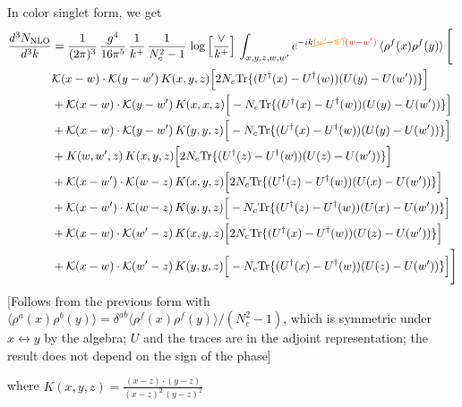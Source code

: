 \documentclass[9pt]{article}
\numberwithin{equation}{section}
\begin{document}
In color singlet form, we get
\begin{align}
\frac{d^{3}N_{\mathrm{NLO}}}{d^{3}k} & = \frac{1}{(2\pi)^{3}}\,\frac{g^{4}}{16\pi^{5}}\,\frac{1}{k^{+}}\,\frac{1}{N^{2}_{c}-1}\,\log\Big[\frac{\vee}{k^{+}}\Big]\,\int_{x,y,z,w,w'}e^{-ik{\color{orange}\cancel{(w'-w)}}{\color{red}(w-w')}}\,\langle\rho^{f}(x)\rho^{f}(y) \rangle\,\Bigg[ \notag\\ & \mathcal K(x-w)\cdot\mathcal K(y-w')\,K(x,y,z)\Big[2 N_{c}{\rm Tr}\{(U^\dagger(x)-U^\dagger(w))(U(y)-U(w'))\}\Big]\notag\\
&+\mathcal K(x-w)\cdot\mathcal K(y-w')\,K(x,x,z)\Big[-N_{c}{\rm Tr}\{(U^\dagger(x)-U^\dagger(w))(U(y)-U(w'))\}\Big]\notag\\
&+\mathcal K(x-w)\cdot\mathcal K(y-w')\,K(y,y,z)\Big[-N_{c}{\rm Tr}\{(U^\dagger(x)-U^\dagger(w))(U(y)-U(w'))\}\Big]\notag\\
&+K(w,w',z)\,K(x,y,z)\Big[2 N_{c}{\rm Tr}\{(U^\dagger(z)-U^\dagger(w))(U(z)-U(w'))\}\Big]\notag\\
&+\mathcal K(x-w')\cdot\mathcal K(w-z)\,K(x,y,z)\Big[2 N_{c}{\rm Tr}\{(U^\dagger(z)-U^\dagger(w))(U(x)-U(w'))\}\Big]\notag\\
&+\mathcal K(x-w')\cdot\mathcal K(w-z)\,K(y,y,z)\Big[-N_{c}{\rm Tr}\{(U^\dagger(z)-U^\dagger(w))(U(x)-U(w'))\}\Big]\notag\\
&+\mathcal K(x-w)\cdot\mathcal K(w'-z)\,K(x,y,z)\Big[2 N_{c}{\rm Tr}\{(U^\dagger(x)-U^\dagger(w))(U(z)-U(w'))\}\Big]\notag\\
&+\mathcal K(x-w)\cdot\mathcal K(w'-z)\,K(y,y,z)\Big[-N_{c}{\rm Tr}\{(U^\dagger(x)-U^\dagger(w))(U(z)-U(w'))\}\Big]\Bigg]
\end{align} {\color{red}[Follows from the previous form with $\langle\rho^{a}(x)\rho^{b}(y)\rangle=\delta^{ab}\langle\rho^{f}(x)\rho^{f}(y)\rangle/(N_c^{2}-1)$, which is symmetric under $x\leftrightarrow y$ by the algebra; $U$ and the traces are in the adjoint representation; the result does not depend on the sign of the phase]}\par\noindent 
where $K(x,y,z) = \frac{(x-z)\cdot (y-z)}{(x-z)^{2}\, (y-z)^{2}}$
\end{document}
